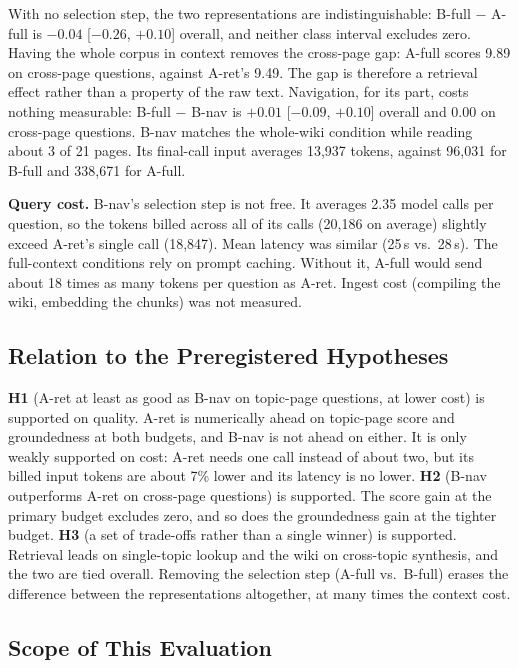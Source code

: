 \documentclass[letterpaper]{article} %
\begin{document}
With no selection step, the two representations are indistinguishable: B-full $-$ A-full is $-0.04$ [$-0.26$, $+0.10$] overall, and neither class interval excludes zero. Having the whole corpus in context removes the cross-page gap: A-full scores 9.89 on cross-page questions, against A-ret's 9.49. The gap is therefore a retrieval effect rather than a property of the raw text. Navigation, for its part, costs nothing measurable: B-full $-$ B-nav is $+0.01$ [$-0.09$, $+0.10$] overall and $0.00$ on cross-page questions. B-nav matches the whole-wiki condition while reading about 3 of 21 pages. Its final-call input averages 13{,}937 tokens, against 96{,}031 for B-full and 338{,}671 for A-full.

\textbf{Query cost.} B-nav's selection step is not free. It averages 2.35 model calls per question, so the tokens billed across all of its calls (20{,}186 on average) slightly exceed A-ret's single call (18{,}847). Mean latency was similar (25\,s vs.\ 28\,s). The full-context conditions rely on prompt caching. Without it, A-full would send about 18 times as many tokens per question as A-ret. Ingest cost (compiling the wiki, embedding the chunks) was not measured.

\subsection{Relation to the Preregistered Hypotheses}

\textbf{H1} (A-ret at least as good as B-nav on topic-page questions, at lower cost) is supported on quality. A-ret is numerically ahead on topic-page score and groundedness at both budgets, and B-nav is not ahead on either. It is only weakly supported on cost: A-ret needs one call instead of about two, but its billed input tokens are about 7\% lower and its latency is no lower. \textbf{H2} (B-nav outperforms A-ret on cross-page questions) is supported. The score gain at the primary budget excludes zero, and so does the groundedness gain at the tighter budget. \textbf{H3} (a set of trade-offs rather than a single winner) is supported. Retrieval leads on single-topic lookup and the wiki on cross-topic synthesis, and the two are tied overall. Removing the selection step (A-full vs.\ B-full) erases the difference between the representations altogether, at many times the context cost.

\subsection{Scope of This Evaluation}
\label{sec:scope}
\end{document}
